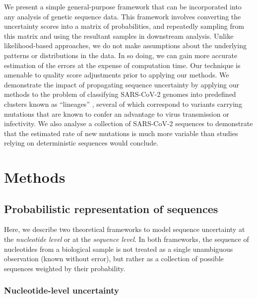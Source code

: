 \documentclass[12pt]{article}
\begin{document}
We present a simple general-purpose framework that can be incorporated into any analysis of genetic sequence data.
This framework involves converting the uncertainty scores into a matrix of probabilities, and repeatedly sampling from this matrix and using the resultant samples in downstream analysis.
Unlike likelihood-based approaches, we do not make assumptions about the underlying patterns or distributions in the data.
In so doing, we can gain more accurate estimation of the errors at the expense of computation time.
Our technique is amenable to quality score adjustments prior to applying our methods.
We demonstrate the impact of propagating sequence uncertainty by applying our methods to the problem of classifying SARS-CoV-2 genomes into predefined clusters known as ``lineages'' \cite{rambautDynamicNomenclatureProposal2020}, several of which correspond to variants carrying mutations that are known to confer an advantage to virus transmission or infectivity.
We also analyse a collection of SARS-CoV-2 sequences to demonstrate that the estimated rate of new mutations is much more variable than studies relying on deterministic sequences would conclude.



\section{Methods}

\subsection{Probabilistic representation of sequences}

Here, we describe two theoretical frameworks to model sequence uncertainty at the \emph{nucleotide level} or at the \emph{sequence level}.
In both frameworks, the sequence of nucleotides from a biological sample is not treated as a single unambiguous observation (known without error), but rather as a collection of possible sequences weighted by their probability.

\subsubsection{Nucleotide-level uncertainty}
\end{document}
